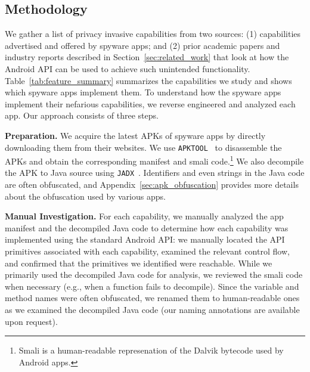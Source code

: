 \subsection{Methodology}
\label{subsec:misuse_discovery}



We gather a list of privacy invasive capabilities from two sources: (1)
capabilities advertised and offered by spyware apps; and (2) prior
academic papers and industry reports described in Section~\ref{sec:related_work} that look at how the Android API
can be used to achieve such unintended functionality.
Table~\ref{tab:feature_summary} summarizes the capabilities we study
and shows which spyware apps implement them.
To understand how the spyware apps implement their nefarious capabilities, we reverse engineered and analyzed each app. Our approach consists of three steps.

\textbf{Preparation.} We acquire the latest APKs of spyware apps by directly downloading them from their websites. We use \texttt{APKTOOL}~\cite{ApktoolA72:online} to disassemble the APKs and obtain the corresponding manifest and smali code.\footnote{Smali is a human-readable represenation of the Dalvik bytecode used by Android apps.} We also decompile the APK to Java source using \texttt{JADX}~\cite{skylotja9:online}. Identifiers and even strings in the Java code are often obfuscated, and Appendix~\ref{sec:apk_obfuscation} provides more details about the obfuscation used
by various apps.

\textbf{Manual Investigation.}
For each capability, we manually analyzed the app manifest and the decompiled Java code to determine how
each capability was implemented using the standard Android API: we manually located the API primitives associated with each capability, examined the relevant control flow, and confirmed that the primitives we identified were reachable. While we primarily used the decompiled Java code for
analysis, we reviewed the smali code when necessary (e.g., when a function fails
to decompile). Since the variable and method names were often obfuscated, we renamed them to human-readable ones as we examined the decompiled Java code (our naming annotations are available upon request).

